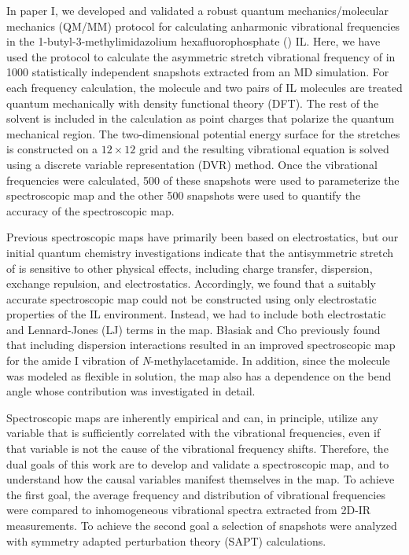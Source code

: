\documentclass[%
  class = book,%
  crop = false,%
  float = true,%
  multi = true,%
  preview = false,%
]{standalone}
\begin{document}
In paper I\cite{Berquist2017}, we developed and validated a robust quantum mechanics/molecular mechanics (QM/MM) protocol for calculating anharmonic  vibrational frequencies in the 1-butyl-3-methylimidazolium hexafluorophosphate (\ce{[C4C1im][PF6]}) IL. Here, we have used the protocol to calculate the asymmetric stretch vibrational frequency of  in 1000 statistically independent snapshots extracted from an MD simulation. For each frequency calculation, the  molecule and two pairs of IL molecules are treated quantum mechanically with density functional theory (DFT). The rest of the solvent is included in the calculation as point charges that polarize the quantum mechanical region. The two-dimensional potential energy surface for the  stretches is constructed on a \(12 \times 12\) grid and the resulting vibrational \schrod{} equation is solved using a discrete variable representation (DVR) method. Once the vibrational frequencies were calculated, \num{500} of these snapshots were used to parameterize the spectroscopic map and the other \num{500} snapshots were used to quantify the accuracy of the spectroscopic map.

Previous spectroscopic maps have primarily been based on electrostatics,\cite{choi_vibrational_2011,corcelliJCP-04a,ohJCP-08,corcelliJPCA-05,schmidt_pronounced_2005-1,blasiak_vibrational_2013,Basiak2014} but our initial quantum chemistry investigations\cite{Brinzer2015,Berquist2017} indicate that the antisymmetric stretch of  is sensitive to other physical effects, including charge transfer, dispersion, exchange repulsion, and electrostatics. Accordingly, we found that a suitably accurate spectroscopic map could not be constructed using only electrostatic properties of the IL environment. Instead, we had to include both electrostatic and Lennard-Jones (LJ) terms in the map. B{\l{}}asiak and Cho previously found that including dispersion interactions resulted in an improved spectroscopic map for the amide I vibration of \textit{N}-methylacetamide.\cite{Basiak2015} In addition, since the  molecule was modeled as flexible in solution, the map also has a dependence on the  bend angle whose contribution was investigated in detail.

Spectroscopic maps are inherently empirical and can, in principle, utilize any variable that is sufficiently correlated with the vibrational frequencies, even if that variable is not the cause of the vibrational frequency shifts. Therefore, the dual goals of this work are to develop and validate a spectroscopic map, and to understand how the causal variables manifest themselves in the map. To achieve the first goal, the average frequency and distribution of vibrational frequencies were compared to inhomogeneous vibrational spectra extracted from 2D-IR measurements. To achieve the second goal a selection of snapshots were analyzed with symmetry adapted perturbation theory (SAPT)\cite{Jeziorski:1994:1887,Hohenstein2010,Hohenstein2011} calculations.
\end{document}
